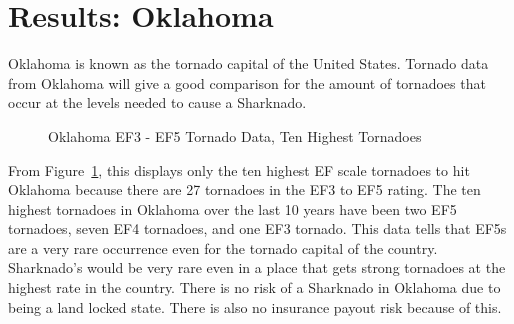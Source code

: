 \documentclass[
  letterpaper,
  DIV=11,
  numbers=noendperiod]{scrreprt}
\begin{document}
\section{Results: Oklahoma}\label{results-oklahoma-1}

Oklahoma is known as the tornado capital of the United States. Tornado
data from Oklahoma will give a good comparison for the amount of
tornadoes that occur at the levels needed to cause a Sharknado.

\begin{figure}


\caption{\label{fig-table4}Oklahoma EF3 - EF5 Tornado Data, Ten Highest
Tornadoes}

\end{figure}%

From Figure~\ref{fig-table4}, this displays only the ten highest EF
scale tornadoes to hit Oklahoma because there are 27 tornadoes in the
EF3 to EF5 rating. The ten highest tornadoes in Oklahoma over the last
10 years have been two EF5 tornadoes, seven EF4 tornadoes, and one EF3
tornado. This data tells that EF5s are a very rare occurrence even for
the tornado capital of the country. Sharknado's would be very rare even
in a place that gets strong tornadoes at the highest rate in the
country. There is no risk of a Sharknado in Oklahoma due to being a land
locked state. There is also no insurance payout risk because of this.
\end{document}
